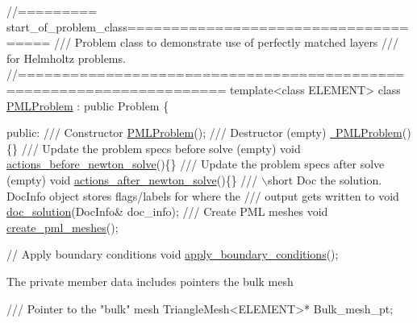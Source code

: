  
\begin{DoxyCodeInclude}
\textcolor{comment}{//========= start\_of\_problem\_class=====================================}
\textcolor{comment}{/// Problem class to demonstrate use of perfectly matched layers}
\textcolor{comment}{}\textcolor{comment}{/// for Helmholtz problems.}
\textcolor{comment}{}\textcolor{comment}{//=====================================================================}
\textcolor{keyword}{template}<\textcolor{keyword}{class} ELEMENT>
\textcolor{keyword}{class }\hyperlink{classPMLProblem}{PMLProblem} : \textcolor{keyword}{public} Problem
\{

\textcolor{keyword}{public}:
\textcolor{comment}{}
\textcolor{comment}{ /// Constructor}
\textcolor{comment}{} \hyperlink{classPMLProblem_ae6cc833e2485ad6d37d6dd14105bf407}{PMLProblem}();
\textcolor{comment}{}
\textcolor{comment}{ /// Destructor (empty)}
\textcolor{comment}{} \hyperlink{classPMLProblem_a4922fc5b0ef4cf43c41ee9149712adb1}{~PMLProblem}()\{\}
\textcolor{comment}{}
\textcolor{comment}{ /// Update the problem specs before solve (empty)}
\textcolor{comment}{} \textcolor{keywordtype}{void} \hyperlink{classPMLProblem_a13feb001d09f64dcfe44bbe3c6fe3d97}{actions\_before\_newton\_solve}()\{\}
\textcolor{comment}{}
\textcolor{comment}{ /// Update the problem specs after solve (empty)}
\textcolor{comment}{} \textcolor{keywordtype}{void} \hyperlink{classPMLProblem_ac171a6a2ff881984b3e057036cbbc414}{actions\_after\_newton\_solve}()\{\}
\textcolor{comment}{}
\textcolor{comment}{ /// \(\backslash\)short Doc the solution. DocInfo object stores flags/labels for where the}
\textcolor{comment}{ /// output gets written to}
\textcolor{comment}{} \textcolor{keywordtype}{void} \hyperlink{classPMLProblem_ae04985b020a9e0526ab829ca316adb26}{doc\_solution}(DocInfo& doc\_info);
\textcolor{comment}{}
\textcolor{comment}{ /// Create PML meshes}
\textcolor{comment}{} \textcolor{keywordtype}{void} \hyperlink{classPMLProblem_aa111bfe53d52cf6b2e1bb3b079c16d43}{create\_pml\_meshes}();

 \textcolor{comment}{// Apply boundary conditions}
 \textcolor{keywordtype}{void} \hyperlink{classPMLProblem_a2d2cdf5c1e99a7600d91353fd0584d5c}{apply\_boundary\_conditions}();

\end{DoxyCodeInclude}


The private member data includes pointers the bulk mesh


\begin{DoxyCodeInclude}
 \textcolor{comment}{/// Pointer to the "bulk" mesh}
 TriangleMesh<ELEMENT>* Bulk\_mesh\_pt;

\end{DoxyCodeInclude}


